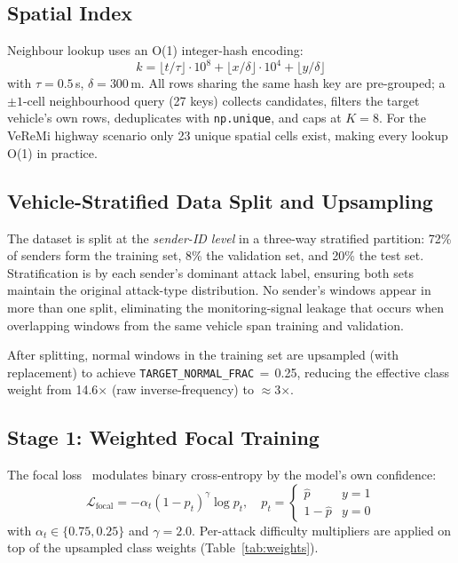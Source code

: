 \documentclass[conference]{IEEEtran}
\begin{document}
\subsection{Spatial Index}
\label{sec:spatial}

Neighbour lookup uses an O(1) integer-hash encoding:
\begin{equation}
k = \lfloor t/\tau \rfloor \cdot 10^8
  + \lfloor x/\delta \rfloor \cdot 10^4
  + \lfloor y/\delta \rfloor
\end{equation}
with $\tau=0.5$\,s, $\delta=300$\,m.  All rows sharing the same hash key
are pre-grouped; a $\pm1$-cell neighbourhood query (27 keys) collects
candidates, filters the target vehicle's own rows, deduplicates with
\texttt{np.unique}, and caps at $K=8$.  For the VeReMi highway scenario
only 23 unique spatial cells exist, making every lookup O(1) in practice.

\subsection{Vehicle-Stratified Data Split and Upsampling}
\label{sec:split}

The dataset is split at the \emph{sender-ID level} in a three-way
stratified partition: 72\% of senders form the training set, 8\% the
validation set, and 20\% the test set.  Stratification is by each
sender's dominant attack label, ensuring both sets maintain the original
attack-type distribution.  No sender's windows appear in more than one
split, eliminating the monitoring-signal leakage that occurs when
overlapping windows from the same vehicle span training and validation.

After splitting, normal windows in the training set are upsampled (with
replacement) to achieve \texttt{TARGET\_NORMAL\_FRAC}\,$=$\,0.25, reducing
the effective class weight from 14.6$\times$ (raw inverse-frequency) to
$\approx$3$\times$.

\subsection{Stage 1: Weighted Focal Training}

The focal loss~\cite{lin2017focal} modulates binary cross-entropy by the
model's own confidence:
\begin{equation}
\mathcal{L}_{\text{focal}} =
  -\alpha_t(1-p_t)^\gamma \log p_t,
\quad p_t =
  \begin{cases} \hat{p} & y=1 \\ 1-\hat{p} & y=0 \end{cases}
\end{equation}
with $\alpha_t \in \{0.75, 0.25\}$ and $\gamma=2.0$.  Per-attack
difficulty multipliers are applied on top of the upsampled class weights
(Table~\ref{tab:weights}).
\end{document}

